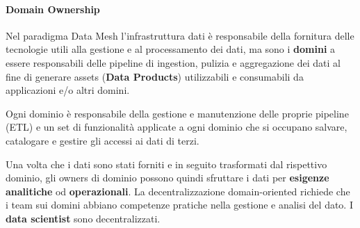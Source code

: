 \paragraph{Domain Ownership}\label{par:db_domain_ownership} %
Nel paradigma Data Mesh l'infrastruttura dati è responsabile della fornitura delle tecnologie utili alla gestione e al processamento dei dati, ma sono i \textbf{domini} a essere responsabili delle pipeline di ingestion, pulizia e aggregazione dei dati al fine di generare assets (\textbf{Data Products}) utilizzabili e consumabili da applicazioni e/o altri domini.
\begin{note}
    Ogni dominio è responsabile della gestione e manutenzione delle proprie pipeline (ETL) e un set di funzionalità applicate a ogni dominio che si occupano salvare, catalogare e gestire gli accessi ai dati di terzi.
\end{note}
Una volta che i dati sono stati forniti e in seguito trasformati dal rispettivo dominio, gli owners di dominio possono quindi sfruttare i dati per \textbf{esigenze analitiche} od \textbf{operazionali}.
La decentralizzazione domain-oriented richiede che i team sui domini abbiano competenze pratiche nella gestione e analisi del dato.
I \textbf{data scientist} sono decentralizzati.
%
